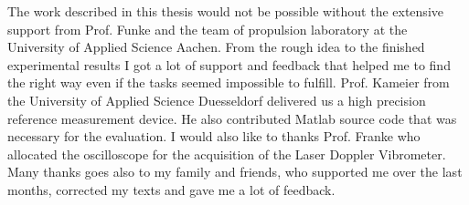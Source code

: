 The work described in this thesis would not be possible without the extensive support from Prof. Funke and the team of propulsion laboratory at the University of Applied Science Aachen. From the rough idea to the finished experimental results I got a lot of support and feedback that helped me to find the right way even if the tasks seemed impossible to fulfill. Prof. Kameier from the University of Applied Science Duesseldorf delivered us a high precision reference measurement device. He also contributed Matlab source code that was necessary for the evaluation. I would also like to thanks Prof. Franke who allocated the oscilloscope for the acquisition of the Laser Doppler Vibrometer. Many thanks goes also to my family and friends, who supported me over the last months, corrected my texts and gave me a lot of feedback.  